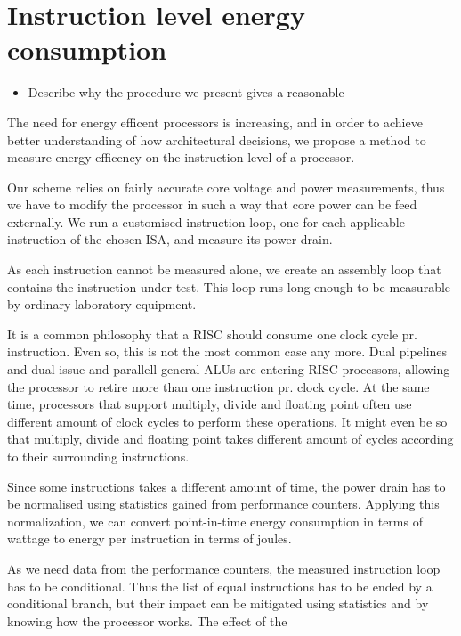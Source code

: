 \section{Instruction level energy consumption} 

\begin{itemize} \item Describe why the procedure we present gives a reasonable
    \end{itemize}


The need for energy efficent processors is increasing, and in order to achieve
better understanding of how architectural decisions, we propose a method to
measure energy efficency on the instruction level of a processor.

Our scheme relies on fairly accurate core voltage and power measurements, thus
we have to modify the processor in such a way that core power can be feed
externally.  We run a customised instruction loop, one for each applicable
instruction of the chosen ISA, and measure its power drain.

As each instruction cannot be measured alone, we create an assembly loop that
contains the instruction under test. This loop runs long enough to be measurable
by ordinary laboratory equipment.

It is a common philosophy that a RISC should consume one clock cycle pr.
instruction\cite{sivarama}. Even so, this is not the most common case any more.
Dual pipelines and dual issue and parallell general ALUs are entering RISC
processors, allowing the processor to retire more than one instruction pr. clock
cycle. At the same time, processors that support multiply, divide and floating
point often use different amount of clock cycles to perform these operations. It
might even be so that multiply, divide and floating point takes different amount
of cycles according to their surrounding instructions.

Since some instructions takes a different amount of time, the power drain has to be
normalised using statistics gained from performance counters. Applying this
normalization, we can convert point-in-time energy consumption in terms of
wattage to energy per instruction in terms of joules.

As we need data from the performance counters, the measured instruction loop has
to be conditional. Thus the list of equal instructions has to be
ended by a conditional branch, but their impact can be mitigated using
statistics and by knowing how the processor works. The effect of the 


